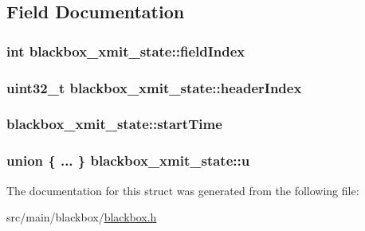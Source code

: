 \subsection{Field Documentation}
\hypertarget{structblackbox__xmit__state_a799e14f5ef793fb5de9720a34e8558d7}{
\subsubsection[{field\+Index}]{\setlength{\rightskip}{0pt plus 5cm}int blackbox\+\_\+xmit\+\_\+state\+::field\+Index}}\label{structblackbox__xmit__state_a799e14f5ef793fb5de9720a34e8558d7}
\hypertarget{structblackbox__xmit__state_ae9bcfe3cb206e5d8008bc2ee38b7f9e0}{
\subsubsection[{header\+Index}]{\setlength{\rightskip}{0pt plus 5cm}uint32\+\_\+t blackbox\+\_\+xmit\+\_\+state\+::header\+Index}}\label{structblackbox__xmit__state_ae9bcfe3cb206e5d8008bc2ee38b7f9e0}
\hypertarget{structblackbox__xmit__state_a2c026b835cae3d13bfb9149d59319faf}{
\subsubsection[{start\+Time}]{ blackbox\+\_\+xmit\+\_\+state\+::start\+Time}}\label{structblackbox__xmit__state_a2c026b835cae3d13bfb9149d59319faf}
\hypertarget{structblackbox__xmit__state_ae06a0e2caa63f3450902c198b6c5ba20}{
\subsubsection[{u}]{\setlength{\rightskip}{0pt plus 5cm}union \{ ... \}   blackbox\+\_\+xmit\+\_\+state\+::u}}\label{structblackbox__xmit__state_ae06a0e2caa63f3450902c198b6c5ba20}


The documentation for this struct was generated from the following file\+:\begin{DoxyCompactItemize}
\item 
src/main/blackbox/\hyperlink{blackbox_2blackbox_8h}{blackbox.\+h}\end{DoxyCompactItemize}
